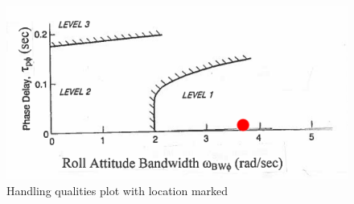 \documentclass[12pt]{article}
\begin{document}
\begin{figure}[h!]
\begin{center}
\includegraphics[height=.2\textheight]{figures/handling_marked}
\caption{Handling qualities plot with location marked}
\end{center}
\end{figure}
\end{document}
